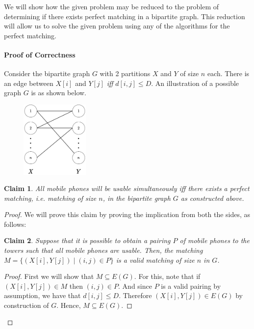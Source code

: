 \documentclass[answers]{exam}
\newtheorem{claim}{Claim}
\begin{document}
\begin{questions}

\begin{solution}
We will show how the given problem may be reduced to the problem of determining if there exists perfect matching in a bipartite graph. This reduction will allow us to solve the given problem using any of the algorithms for the perfect matching. 

\paragraph{Proof of Correctness}
Consider the bipartite graph $G$ with 2 partitions $X$ and $Y$ of size $n$ each. There is an edge between $X[i]$ and $Y[j]$ \emph{iff} $d[i, j] \leq D$.
An illustration of a possible graph $G$ is as shown below.
\begin{figure}[H]
    \centering
    \includegraphics[width=0.3\textwidth]{Bipartite1.pdf}
\end{figure}

\begin{claim}
All mobile phones will be usable simultaneously \emph{iff} there exists a perfect matching, i.e. matching of size $n$, in the bipartite graph $G$ as constructed above.
\end{claim}
\begin{proof}
We will prove this claim by proving the implication from both the sides, as follows:
\begin{claim}
Suppose that it is possible to obtain a pairing $P$ of mobile phones to the towers such that all mobile phones are usable. Then, the matching $M = \{(X[i], Y[j]) \mid (i, j) \in P\}$ is a valid matching of size $n$ in $G$.
\end{claim}
\begin{proof}
First we will show that $M \subseteq E(G)$. For this, note that if $(X[i], Y[j]) \in M$ then $(i, j) \in P$. And since $P$ is a valid pairing by assumption, we have that $d[i,j] \leq D$. Therefore $(X[i], Y[j]) \in E(G)$ by construction of $G$. Hence, $M \subseteq E(G)$. 


\end{proof}
\end{proof}
\end{solution}
\end{questions}
\end{document}
